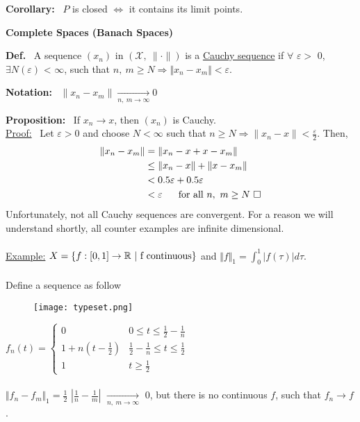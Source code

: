 \documentclass[letterpaper]{article}
\newcommand{\real}{\mathbb R}  %
\begin{document}
\noindent \textbf{Corollary:}~ $P$ is closed $\Leftrightarrow$ it contains its limit points.

\begin{center}
    \textbf{Complete Spaces (Banach Spaces)}
\end{center}

\noindent \textbf{Def.}~ A sequence $(x_n)$ in $(\mathcal{X},\ \|\cdot\|)$ is a \underline{Cauchy sequence} if $\forall$ $\varepsilon >$ 0, $\exists N(\varepsilon)$ < $\infty$, such that $n,\ m \geq N\Rightarrow\Vert x_n - x_m\Vert < \varepsilon$.

\noindent \textbf{Notation:}~ $\|x_n-x_m\|\xrightarrow[n,\ m \to \infty]{}0$

\noindent \textbf{Proposition:}~ If $x_n\rightarrow x$, then $(x_n)$ is Cauchy.\\
    \underline{Proof:}~ Let $\varepsilon>0$ and choose $N<\infty$ such that $n\geq N\Rightarrow\|x_n-x\|<\frac{\varepsilon}{2}$. Then,     \begin{align*}
            \Vert x_n - x_m \Vert &= \Vert x_n - x + x - x_m \Vert\\
            &\leq \Vert x_n - x \Vert + \Vert x- x_m \Vert\\
            &< 0.5\varepsilon + 0.5\varepsilon\\
            &< \varepsilon\ \ \ \ \ \textnormal{for all }n,\ m\geq N\ \square
        \end{align*}
    Unfortunately, not all Cauchy sequences are convergent. For a reason we will understand shortly, all counter examples are infinite dimensional.\\ \\
    \underline{Example:}  $ X =  \{f:[0,1] \rightarrow \real \ \vert\ \textnormal{f continuous}\}$ and $ \Vert f \Vert_1 = \int_0^1 \vert f(\tau)\vert d\tau$.\\ \\
    Define a sequence as follow\\
    \begin{figure}[ht]
        \texttt{[image: typeset.png]}
    \end{figure}
    $f_n(t)=\begin{cases}
        0 & 0\leq t\leq\frac{1}{2}-\frac{1}{n}\\
        1+n(t-\frac{1}{2}) & \frac{1}{2}-\frac{1}{n}\leq t\leq\frac{1}{2}\\
        1 & t\geq\frac{1}{2}
    \end{cases}
    $\\ \\
    $\Vert f_n - f_m \Vert_1=\frac{1}{2}$  $|\frac{1}{n}- \frac{1}{m}|$ $\xrightarrow[n,\ m \to \infty]{}$ 0, but there is no continuous $f$, such that $f_n \rightarrow f$.
\end{document}
